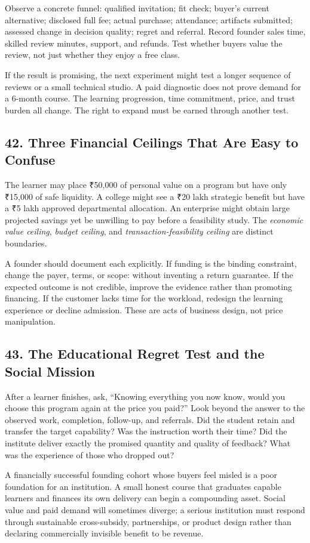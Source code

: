Observe a concrete funnel: qualified invitation; fit check; buyer's current alternative; disclosed full fee; actual purchase; attendance; artifacts submitted; assessed change in decision quality; regret and referral. Record founder sales time, skilled review minutes, support, and refunds. Test whether buyers value the review, not just whether they enjoy a free class.

If the result is promising, the next experiment might test a longer sequence of reviews or a small technical studio. A paid diagnostic does not prove demand for a 6-month course. The learning progression, time commitment, price, and trust burden all change. The right to expand must be earned through another test.

\subsection*{42. Three Financial Ceilings That Are Easy to Confuse}

The learner may place ₹50,000 of personal value on a program but have only ₹15,000 of safe liquidity. A college might see a ₹20 lakh strategic benefit but have a ₹5 lakh approved departmental allocation. An enterprise might obtain large projected savings yet be unwilling to pay before a feasibility study. The \emph{economic value ceiling}, \emph{budget ceiling}, and \emph{transaction-feasibility ceiling} are distinct boundaries.

A founder should document each explicitly. If funding is the binding constraint, change the payer, terms, or scope: without inventing a return guarantee. If the expected outcome is not credible, improve the evidence rather than promoting financing. If the customer lacks time for the workload, redesign the learning experience or decline admission. These are acts of business design, not price manipulation.

\subsection*{43. The Educational Regret Test and the Social Mission}

After a learner finishes, ask, ``Knowing everything you now know, would you choose this program again at the price you paid?'' Look beyond the answer to the observed work, completion, follow-up, and referrals. Did the student retain and transfer the target capability? Was the instruction worth their time? Did the institute deliver exactly the promised quantity and quality of feedback? What was the experience of those who dropped out?

A financially successful founding cohort whose buyers feel misled is a poor foundation for an institution. A small honest course that graduates capable learners and finances its own delivery can begin a compounding asset. Social value and paid demand will sometimes diverge; a serious institution must respond through sustainable cross-subsidy, partnerships, or product design rather than declaring commercially invisible benefit to be revenue.

